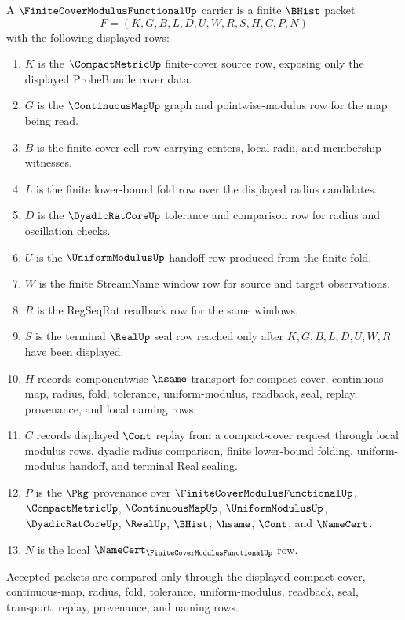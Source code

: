 \begin{definition}
\label{def:finite-cover-modulus-functional-carrier}
A $\FiniteCoverModulusFunctionalUp$ carrier is a finite $\BHist$ packet
$$
F=(K,G,B,L,D,U,W,R,S,H,C,P,N)
$$
with the following displayed rows:
\begin{enumerate}
\item $K$ is the $\CompactMetricUp$ finite-cover source row, exposing only the displayed ProbeBundle cover data.
\item $G$ is the $\ContinuousMapUp$ graph and pointwise-modulus row for the map being read.
\item $B$ is the finite cover cell row carrying centers, local radii, and membership witnesses.
\item $L$ is the finite lower-bound fold row over the displayed radius candidates.
\item $D$ is the $\DyadicRatCoreUp$ tolerance and comparison row for radius and oscillation checks.
\item $U$ is the $\UniformModulusUp$ handoff row produced from the finite fold.
\item $W$ is the finite StreamName window row for source and target observations.
\item $R$ is the RegSeqRat readback row for the same windows.
\item $S$ is the terminal $\RealUp$ seal row reached only after $K,G,B,L,D,U,W,R$ have been displayed.
\item $H$ records componentwise $\hsame$ transport for compact-cover, continuous-map, radius, fold, tolerance, uniform-modulus, readback, seal, replay, provenance, and local naming rows.
\item $C$ records displayed $\Cont$ replay from a compact-cover request through local modulus rows, dyadic radius comparison, finite lower-bound folding, uniform-modulus handoff, and terminal Real sealing.
\item $P$ is the $\Pkg$ provenance over $\FiniteCoverModulusFunctionalUp$, $\CompactMetricUp$, $\ContinuousMapUp$, $\UniformModulusUp$, $\DyadicRatCoreUp$, $\RealUp$, $\BHist$, $\hsame$, $\Cont$, and $\NameCert$.
\item $N$ is the local $\NameCert_{\FiniteCoverModulusFunctionalUp}$ row.
\end{enumerate}
Accepted packets are compared only through the displayed compact-cover, continuous-map, radius, fold, tolerance, uniform-modulus, readback, seal, transport, replay, provenance, and naming rows.
\end{definition}

